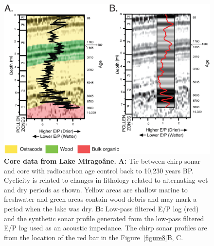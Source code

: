 \documentclass[linenumbers,draft]{agujournal}
\begin{document}
\begin{figure}
\centering
\includegraphics[width=\textwidth]{Haiti_figure9}
\caption{\textbf{Core data from Lake Mirago\^ane.} \textbf{A:} Tie between chirp sonar and core with radiocarbon age control back to 10,230 years BP. \citep{higuera199910} Cyclicity is related to changes in lithology related to alternating wet and dry periods as shown. Yellow areas are shallow marine to freshwater and green areas contain wood debris and may mark a period when the lake was dry. \textbf{B:} Low-pass filtered E/P log (red) and the synthetic sonar profile generated from the low-pass filtered E/P log used as an acoustic impedance. The chirp sonar profiles are from the location of the red bar in the Figure~\ref{figure8}B, C.}
\label{figure9}
\end{figure}
\end{document}
